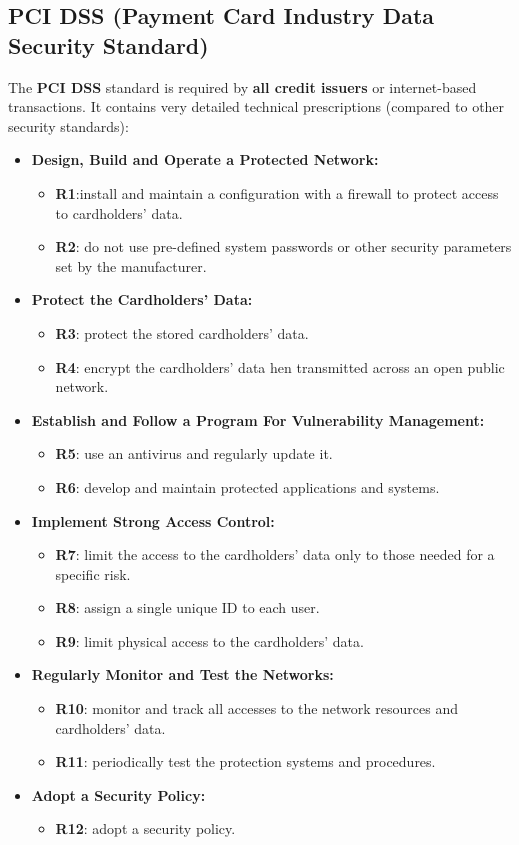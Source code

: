 \subsection{PCI DSS (Payment Card Industry Data Security Standard)}
The \textbf{PCI DSS} standard is required by \textbf{all credit issuers} or internet-based transactions. It contains very detailed technical prescriptions (compared to other security standards):
\begin{itemize}
    \item \textbf{Design, Build and Operate a Protected Network:}
    \begin{itemize}
        \item \textbf{R1}:install and maintain a configuration with a firewall to protect access to cardholders’ data.
        \item \textbf{R2}: do not use pre-defined system passwords or other security parameters set by
        the manufacturer.
    \end{itemize}
    \item \textbf{Protect the Cardholders’ Data:}
    \begin{itemize}
        \item \textbf{R3}: protect the stored cardholders’ data.
        \item \textbf{R4}: encrypt the cardholders’ data hen transmitted across an open public network.
    \end{itemize}
    \item \textbf{Establish and Follow a Program For Vulnerability Management:}
    \begin{itemize}
        \item \textbf{R5}: use an antivirus and regularly update it.
        \item \textbf{R6}: develop and maintain protected applications and systems.
    \end{itemize}
    \item \textbf{Implement Strong Access Control:}
    \begin{itemize}
        \item \textbf{R7}: limit the access to the cardholders’ data only to those needed for a specific risk.
        \item \textbf{R8}: assign a single unique ID to each user.
        \item \textbf{R9}: limit physical access to the cardholders’ data.
    \end{itemize}
    \item \textbf{Regularly Monitor and Test the Networks:}
    \begin{itemize}
        \item \textbf{R10}: monitor and track all accesses to the network resources and cardholders’ data.
        \item \textbf{R11}: periodically test the protection systems and procedures.
    \end{itemize}
    \item \textbf{Adopt a Security Policy:}
    \begin{itemize}
        \item \textbf{R12}: adopt a security policy.
    \end{itemize}
\end{itemize}